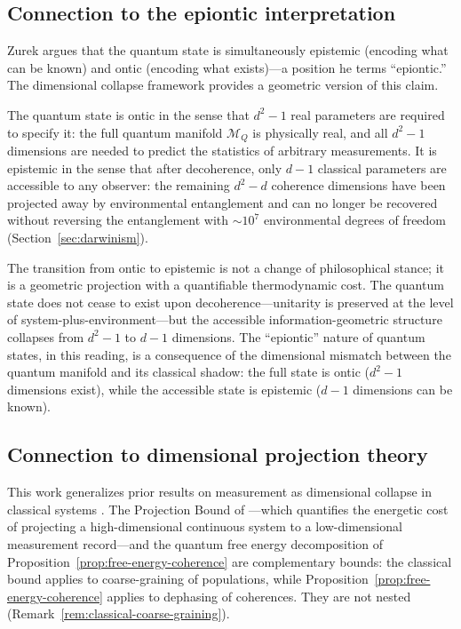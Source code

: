 \documentclass[12pt,a4paper]{article}
\theoremstyle{definition}
\theoremstyle{remark}
\begin{document}
\subsection{Connection to the epiontic interpretation}
\label{sec:epiontic}

Zurek \cite{zurek2025decoherence} argues that the quantum state is simultaneously epistemic (encoding what can be known) and ontic (encoding what exists)---a position he terms ``epiontic.'' The dimensional collapse framework provides a geometric version of this claim.

The quantum state is ontic in the sense that $d^2 - 1$ real parameters are required to specify it: the full quantum manifold $\mathcal{M}_Q$ is physically real, and all $d^2 - 1$ dimensions are needed to predict the statistics of arbitrary measurements. It is epistemic in the sense that after decoherence, only $d - 1$ classical parameters are accessible to any observer: the remaining $d^2 - d$ coherence dimensions have been projected away by environmental entanglement and can no longer be recovered without reversing the entanglement with $\sim\!10^7$ environmental degrees of freedom (Section~\ref{sec:darwinism}).

The transition from ontic to epistemic is not a change of philosophical stance; it is a geometric projection with a quantifiable thermodynamic cost. The quantum state does not cease to exist upon decoherence---unitarity is preserved at the level of system-plus-environment---but the accessible information-geometric structure collapses from $d^2 - 1$ to $d - 1$ dimensions. The ``epiontic'' nature of quantum states, in this reading, is a consequence of the dimensional mismatch between the quantum manifold and its classical shadow: the full state is ontic ($d^2 - 1$ dimensions exist), while the accessible state is epistemic ($d - 1$ dimensions can be known).

\subsection{Connection to dimensional projection theory}
\label{sec:projection-theory}

This work generalizes prior results on measurement as dimensional collapse in classical systems \cite{todd2025falsifiability,todd2025timing}. The Projection Bound of \cite{todd2025timing}---which quantifies the energetic cost of projecting a high-dimensional continuous system to a low-dimensional measurement record---and the quantum free energy decomposition of Proposition~\ref{prop:free-energy-coherence} are complementary bounds: the classical bound applies to coarse-graining of populations, while Proposition~\ref{prop:free-energy-coherence} applies to dephasing of coherences. They are not nested (Remark~\ref{rem:classical-coarse-graining}).
\end{document}
